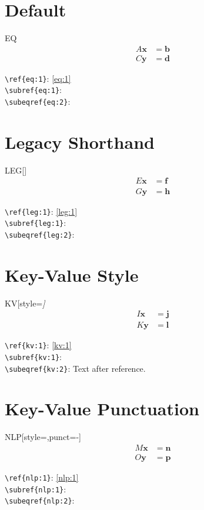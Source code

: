 \documentclass{article}
\begin{document}
\section*{Default}
\begin{namedsubeqs}{EQ}
\begin{align}
  A\mathbf{x} &= \mathbf{b} \label{eq:1}\\
  C\mathbf{y} &= \mathbf{d} \label{eq:2}
\end{align}
\end{namedsubeqs}

\noindent
\verb|\ref{eq:1}|: \ref{eq:1}\\
\verb|\subref{eq:1}|: \\
\verb|\subeqref{eq:2}|: 

\section*{Legacy Shorthand}
\begin{namedsubeqs}{LEG}[\roman]
\begin{align}
  E\mathbf{x} &= \mathbf{f} \label{leg:1}\\
  G\mathbf{y} &= \mathbf{h} \label{leg:2}
\end{align}
\end{namedsubeqs}

\noindent
\verb|\ref{leg:1}|: \ref{leg:1}\\
\verb|\subref{leg:1}|: \\
\verb|\subeqref{leg:2}|: 

\section*{Key-Value Style}
\begin{namedsubeqs}{KV}[style=\itshape\roman]
\begin{align}
  I\mathbf{x} &= \mathbf{j} \label{kv:1}\\
  K\mathbf{y} &= \mathbf{l} \label{kv:2}
\end{align}
\end{namedsubeqs}

\noindent
\verb|\ref{kv:1}|: \ref{kv:1}\\
\verb|\subref{kv:1}|: \\
\verb|\subeqref{kv:2}|:  Text after reference.

\section*{Key-Value Punctuation}
\begin{namedsubeqs}{NLP}[style=\roman,punct=-]
\begin{align}
  M\mathbf{x} &= \mathbf{n} \label{nlp:1}\\
  O\mathbf{y} &= \mathbf{p} \label{nlp:2}
\end{align}
\end{namedsubeqs}

\noindent
\verb|\ref{nlp:1}|: \ref{nlp:1}\\
\verb|\subref{nlp:1}|: \\
\verb|\subeqref{nlp:2}|: 
\end{document}

